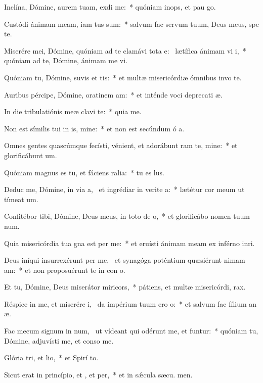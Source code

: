 \item Inclína, Dómine, aurem tuam,  exdi me:~* quóniam inops, et pau  go.
\item Custódi ánimam meam, iam tus sum:~* salvum fac servum tuum, Deus meus, spe  te.
\item Miserére mei, Dómine, quóniam ad te clamávi tota e:~\pscross{} lætífica ánimam vi i,~* quóniam ad te, Dómine, ánimam me vi.
\item Quóniam tu, Dómine, suvis et tis:~* et multæ misericórdiæ ómnibus invo te.
\item Auribus pércipe, Dómine, oratinem am:~* et inténde voci deprecati æ.
\item In die tribulatiónis meæ clavi  te:~* quia  me.
\item Non est símilis tui in is, mine:~* et non est secúndum ó a.
\item Omnes gentes quascúmque fecísti, vénient, et adorábunt ram te, mine:~* et glorificábunt  um.
\item Quóniam magnus es tu, et fáciens ralia:~* tu es  lus.
\item Deduc me, Dómine, in via a,~\pscross{} et ingrédiar in verite a:~* lætétur cor meum ut tímeat  um.
\item Confitébor tibi, Dómine, Deus meus, in toto de o,~* et glorificábo nomen tuum  num.
\item Quia misericórdia tua gna est per me:~* et eruísti ánimam meam ex inférno inri.
\item Deus iníqui insurrexérunt per me,~\pscross{} et synagóga poténtium quæsiérunt nimam am:~* et non proposuérunt te in con o.
\item Et tu, Dómine, Deus miserátor  miricors,~* pátiens, et multæ misericórdi,  rax.
\item Réspice in me, et miserére i,~\pscross{} da impérium tuum ero o:~* et salvum fac fílium an æ.
\item Fac mecum signum in num,~\pscross{} ut vídeant qui odérunt me, et funtur:~* quóniam tu, Dómine, adjuvísti me, et conso  me.
\item Glória tri, et lio,~* et Spirí to.
\item Sicut erat in princípio, et , et per,~* et in sǽcula sæcu. men.
